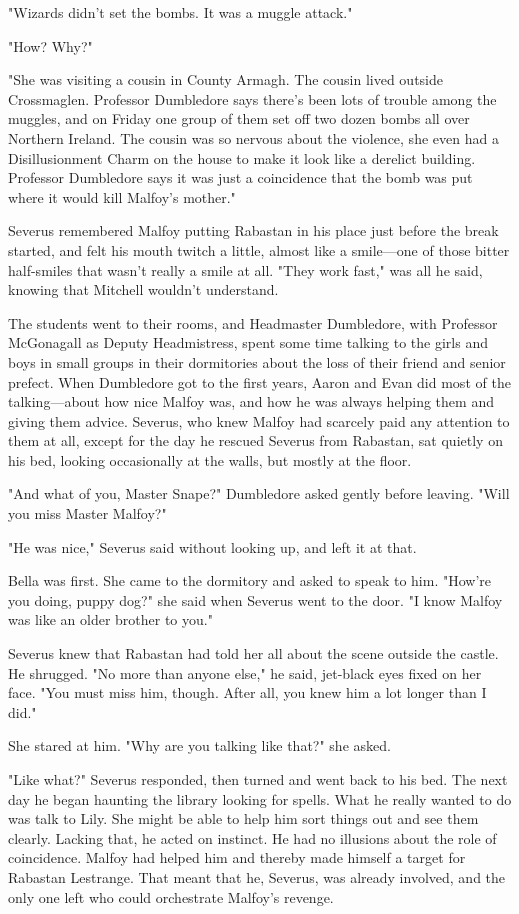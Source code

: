 "Wizards didn't set the bombs. It was a muggle attack."

"How? Why?"

"She was visiting a cousin in County Armagh. The cousin lived outside Crossmaglen. Professor Dumbledore says there's been lots of trouble among the muggles, and on Friday one group of them set off two dozen bombs all over Northern Ireland. The cousin was so nervous about the violence, she even had a Disillusionment Charm on the house to make it look like a derelict building. Professor Dumbledore says it was just a coincidence that the bomb was put where it would kill Malfoy's mother."

Severus remembered Malfoy putting Rabastan in his place just before the break started, and felt his mouth twitch a little, almost like a smile—one of those bitter half-smiles that wasn't really a smile at all. "They work fast," was all he said, knowing that Mitchell wouldn't understand.

The students went to their rooms, and Headmaster Dumbledore, with Professor McGonagall as Deputy Headmistress, spent some time talking to the girls and boys in small groups in their dormitories about the loss of their friend and senior prefect. When Dumbledore got to the first years, Aaron and Evan did most of the talking—about how nice Malfoy was, and how he was always helping them and giving them advice. Severus, who knew Malfoy had scarcely paid any attention to them at all, except for the day he rescued Severus from Rabastan, sat quietly on his bed, looking occasionally at the walls, but mostly at the floor.

"And what of you, Master Snape?" Dumbledore asked gently before leaving. "Will you miss Master Malfoy?"

"He was{\el} nice," Severus said without looking up, and left it at that.

Bella was first. She came to the dormitory and asked to speak to him. "How're you doing, puppy dog?" she said when Severus went to the door. "I know Malfoy was like an older brother to you."

Severus knew that Rabastan had told her all about the scene outside the castle. He shrugged. "No more than anyone else," he said, jet-black eyes fixed on her face. "You must miss him, though. After all, you knew him a lot longer than I did."

She stared at him. "Why are you talking like that?" she asked.

"Like what?" Severus responded, then turned and went back to his bed. The next day he began haunting the library looking for spells. What he really wanted to do was talk to Lily. She might be able to help him sort things out and see them clearly. Lacking that, he acted on instinct. He had no illusions about the role of coincidence. Malfoy had helped him and thereby made himself a target for Rabastan Lestrange. That meant that he, Severus, was already involved, and the only one left who could orchestrate Malfoy's revenge.

